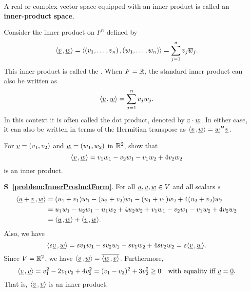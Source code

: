 \begin{definition}
A real or complex vector space equipped with an inner product is called an \textbf{inner-product space}.
\end{definition}

\begin{example} \label{example:StandardInnerProduct}
Consider the inner product on $F^n$ defined by
\begin{equation*}
{\left\langle  \underline{v}  \mskip2mu ,  \underline{w}  \right\rangle}
= {\left\langle  (v_1, \ldots, v_n)  \mskip2mu ,  (w_1, \ldots, w_n)  \right\rangle}
= \sum_{j=1}^n v_j \overline{w}_j.
\end{equation*}
This inner product is called the .
When $F = \mathbb{R}$, the standard inner product can also be written as
\begin{equation*}
{\left\langle  \underline{v}  \mskip2mu ,  \underline{w}  \right\rangle}
= \sum_{j=1}^n v_j w_j.
\end{equation*}
In this context it is often called the dot product, denoted by $\underline{v} \cdot \underline{w}$.
In either case, it can also be written in terms of the Hermitian transpose as $ {\left\langle  \underline{v}  \mskip2mu ,  \underline{w}  \right\rangle} = \underline{w}^H \underline{v} $.

\end{example}

\begin{problem} \label{problem:InnerProductForm}
For $\underline{v} = (v_1, v_2)$ and $\underline{w} = (w_1, w_2)$  in $\mathbb{R}^2$, show that
\begin{equation*}
{\left\langle  \underline{v}  \mskip2mu ,  \underline{w}  \right\rangle}
= v_1 w_1 - v_2 w_1 - v_1 w_2 + 4 v_2 w_2
\end{equation*}
is an inner product.
\end{problem}
\noindent \textbf{S~\ref{problem:InnerProductForm}}.
For all $\underline{u}, \underline{v}, \underline{w} \in V$ and all scalars $s$
\begin{equation*}
\begin{split}
{\left\langle  \underline{u} + \underline{v}  \mskip2mu ,  \underline{w}  \right\rangle}
&= (u_1 + v_1) w_1 - (u_2 + v_2) w_1 - (u_1 + v_1) w_2 + 4 (u_2 + v_2) w_2 \\
&= u_1 w_1 - u_2 w_1 - u_1 w_2 + 4 u_2 w_2
+ v_1 w_1 - v_2 w_1 - v_1 w_2 + 4 v_2 w_2 \\
&= {\left\langle  \underline{u}  \mskip2mu ,  \underline{w}  \right\rangle}
+ {\left\langle  \underline{v}  \mskip2mu ,  \underline{w}  \right\rangle}.
\end{split}
\end{equation*}
Also, we have
\begin{equation*}
{\left\langle  s \underline{v}  \mskip2mu ,  \underline{w}  \right\rangle}
= s v_1 w_1 - s v_2 w_1 - s v_1 w_2 + 4 s v_2 w_2
= s {\left\langle  \underline{v}  \mskip2mu ,  \underline{w}  \right\rangle}.
\end{equation*}
Since $V = \mathbb{R}^2$, we have ${\left\langle  \underline{v}  \mskip2mu ,  \underline{w}  \right\rangle} = \overline{ {\left\langle  \underline{w}  \mskip2mu ,  \underline{v}  \right\rangle} }$.
Furthermore,
\begin{equation*}
{\left\langle  \underline{v}  \mskip2mu ,  \underline{v}  \right\rangle}
= v_1^2 - 2 v_1 v_2 + 4 v_2^2
= ( v_1 - v_2 )^2 + 3 v_2^2
\geq 0
\quad \text{with equality iff } \underline{v} = \underline{0}.
\end{equation*}
That is, ${\left\langle  \underline{v}  \mskip2mu ,  \underline{v}  \right\rangle}$ is an inner product.


